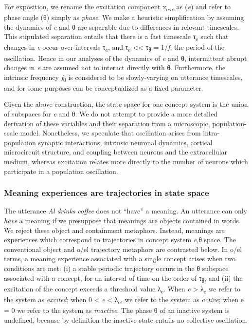   For exposition, we rename the excitation component x\textsubscript{exc} as (\textit{e}) and refer to phase angle (θ) simply as \textit{phase}. We make a heuristic simplification by assuming the dynamics of \textit{e} and θ are separable due to differences in relevant timescales. This stipulated separation entails that there is a fast timescale τ\textsubscript{e} such that changes in \textit{e} occur over intervals τ\textsubscript{e}, and τ\textsubscript{e} << τ\textsubscript{θ} = 1/\textit{f}, the period of the oscillation. Hence in our analyses of the dynamics of \textit{e} and θ, intermittent abrupt changes in \textit{e} are assumed not to interact directly with θ. Furthermore, the intrinsic frequency \textit{f}\textsubscript{0} is considered to be slowly-varying on utterance timescales, and for some purposes can be conceptualized as a fixed parameter. 

  Given the above construction, the state space for one concept system is the union of subspaces for \textit{e} and θ. We do not attempt to provide a more detailed derivation of these variables and their separation from a microscopic, population-scale model. Nonetheless, we speculate that oscillation arises from intra-population synaptic interactions, intrinsic neuronal dynamics, cortical microcircuit structure, and coupling between neurons and the extracellular medium, whereas excitation relates more directly to the number of neurons which participate in a population oscillation.  

\subsubsection{Meaning experiences are trajectories in state space}

The utterance \textit{Al} \textit{drinks} \textit{coffee} does not “have” a meaning. An utterance can only \textit{have} a meaning if we presuppose that meanings are objects contained in words. We reject these object and containment metaphors. Instead, meanings are experiences which correspond to trajectories in concept system \textit{e},θ space. The conventional object and o/el trajectory metaphors are contrasted below. In o/el terms, a meaning experience associated with a single concept arises when two conditions are met: (i) a stable periodic trajectory occurs in the θ subspace associated with a concept, for an interval of time on the order of τ\textsubscript{θ}, and (ii) the excitation of the concept exceeds a threshold value λ\textsubscript{e}. When \textit{e} > λ\textsubscript{e} we refer to the system as \textit{excited}; when 0 < \textit{e} < λ\textsubscript{e}, we refer to the system as \textit{active}; when e = 0 we refer to the system as \textit{inactive}. The phase θ of an inactive system is undefined, because by definition the inactive state entails no collective oscillation. 

